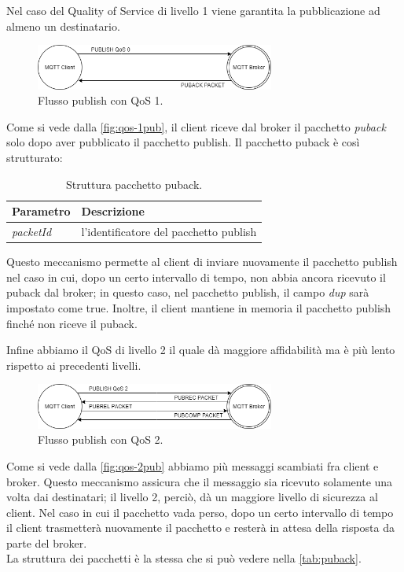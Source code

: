 \documentclass[binding=0.6cm,TFA]{sapthesis}
\begin{document}
\begin{large}
Nel caso del Quality of Service di livello 1 viene garantita la pubblicazione ad almeno un destinatario.
\begin{figure}[h]
\centering
\includegraphics[width=0.7\textwidth]{images/publish-qos1.png}
\caption{Flusso publish con QoS 1.}
\label{fig:qos-1pub}
\end{figure}

Come si vede dalla \autoref{fig:qos-1pub}, il client riceve dal broker il pacchetto \textit{puback} solo dopo aver pubblicato il pacchetto publish. 
Il pacchetto puback è così strutturato:
\begin{table}[h]
\caption{Struttura pacchetto puback.}
\label{tab:puback}
\begin{tabular}{lp{}}
\toprule
\textbf{Parametro} & \textbf{Descrizione} \\
\midrule
\textit{packetId} & l'identificatore del pacchetto publish \\
\bottomrule
\end{tabular}
\end{table}

Questo meccanismo permette al client di inviare nuovamente il pacchetto publish nel caso in cui, dopo un certo intervallo di tempo, non abbia ancora ricevuto il puback dal broker; in questo caso, nel pacchetto publish, il campo \textit{dup} sarà impostato come true. Inoltre, il client mantiene in memoria il pacchetto publish finché non riceve il puback.

Infine abbiamo il QoS di livello 2 il quale dà maggiore affidabilità ma è più lento rispetto ai precedenti livelli.

\begin{figure}[h]
\centering
\includegraphics[width=0.7\textwidth]{images/publish-qos2.png}
\caption{Flusso publish con QoS 2.}
\label{fig:qos-2pub}
\end{figure}

Come si vede dalla \autoref{fig:qos-2pub} abbiamo più messaggi scambiati fra client e broker. Questo meccanismo assicura che il messaggio sia ricevuto solamente una volta dai destinatari; il livello 2, perciò, dà un maggiore livello di sicurezza al client.
Nel caso in cui il pacchetto vada perso, dopo un certo intervallo di tempo il client trasmetterà nuovamente il pacchetto e resterà in attesa della risposta da parte del broker. \\
La struttura dei pacchetti è la stessa che si può vedere nella \autoref{tab:puback}. \\


\end{large}
\end{document}
